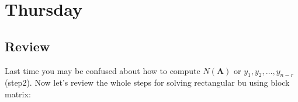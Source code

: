 

\section{Thursday}
\subsection{Review}
Last time you may be confused about how to compute $N(\bm A)$ or $y_1,y_2,\dots,y_{n-r}$ (step2). Now let's review the whole steps for solving rectangular bu using block matrix:\\
